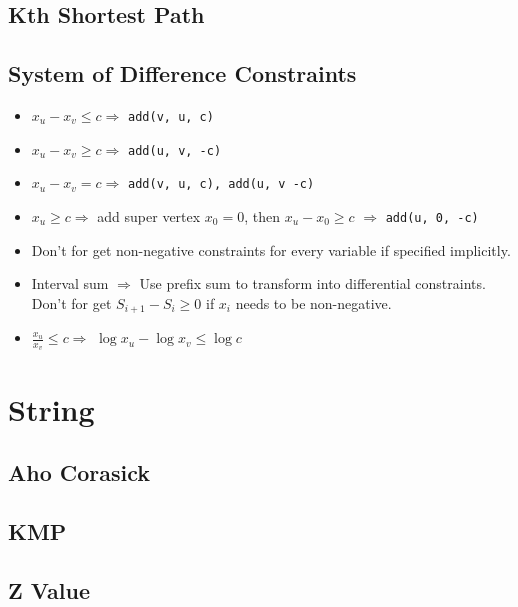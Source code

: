 \documentclass[a4paper,10pt,twocolumn,oneside,x11names]{article}
\begin{document}
\subsection{Kth Shortest Path}


\subsection{System of Difference Constraints}

\begin{itemize}
	\item $x_u - x_v \le c \Rightarrow$ \texttt{add(v, u, c)}
	\item $x_u - x_v \ge c \Rightarrow$ \texttt{add(u, v, -c)}
	\item $x_u - x_v = c \Rightarrow$ \texttt{add(v, u, c), add(u, v -c)}
	\item $x_u \ge c \Rightarrow$ add super vertex $x_0 = 0$, then $x_u - x_0 \ge c$ $\Rightarrow$ \texttt{add(u, 0, -c)}
	\item Don't for get non-negative constraints for every variable if specified implicitly.
	\item Interval sum $\Rightarrow$ Use prefix sum to transform into differential constraints.  Don't for get $S_{i+1} - S_{i} \ge 0$ if $x_i$ needs to be non-negative.
	\item $\frac{x_u}{x_v} \le c \Rightarrow$ $\log{x_u} - \log{x_v} \le \log{c}$
\end{itemize}


\section{String}

\subsection{Aho Corasick}


\subsection{KMP}


\subsection{Z Value}

\end{document}
